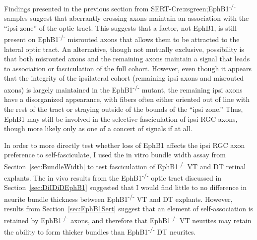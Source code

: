 \label{sec:EphB1invitro}
Findings presented in the previous section from SERT-Cre:zsgreen;EphB1\textsuperscript{-/-} samples suggest that aberrantly crossing axons maintain an association with the ``ipsi zone'' of the optic tract.
This suggests that a factor, not EphB1, is still present on EphB1\textsuperscript{-/-} misrouted axons that allows them to be attracted to the lateral optic tract.
An alternative, though not mutually exclusive, possibility is that both misrouted axons and the remaining axons maintain a signal that leads to association or fasciculation of the full cohort.
However, even though it appears that the integrity of the ipsilateral cohort (remaining ipsi axons and misrouted axons) is largely maintained in the EphB1\textsuperscript{-/-} mutant, the remaining ipsi axons have a disorganized appearance, with fibers often either oriented out of line with the rest of the tract or straying outside of the bounds of the ``ipsi zone.''
Thus, EphB1 may still be involved in the selective fasciculation of ipsi RGC axons, though more likely only as one of a concert of signals if at all.

In order to more directly test whether loss of EphB1 affects the ipsi RGC axon preference to self-fasciculate, I used the in vitro bundle width assay from Section~\ref{sec:BundleWidth} to test fasciculation of EphB1\textsuperscript{-/-} VT and DT retinal explants.
The in vivo results from the EphB1\textsuperscript{-/-} optic tract discussed in Section~\ref{sec:DiIDiDEphB1} suggested that I would find little to no difference in neurite bundle thickness between EphB1\textsuperscript{-/-} VT and DT explants.
However, results from Section~\ref{sec:EphB1Sert} suggest that an element of self-association is retained by EphB1\textsuperscript{-/-} axons, and therefore that EphB1\textsuperscript{-/-} VT neurites may retain the ability to form thicker bundles than EphB1\textsuperscript{-/-} DT neurites.

